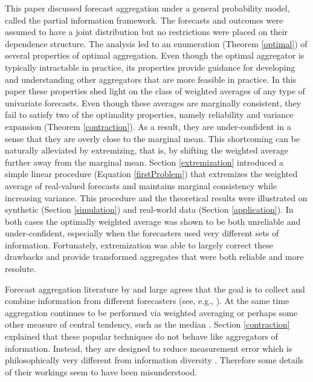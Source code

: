\documentclass[11pt]{article}
\theoremstyle{definition}
\theoremstyle{definition}
\begin{document}
This paper discussed forecast aggregation under a general probability model, called the partial information framework. The forecasts and outcomes were assumed to have a joint distribution but no restrictions were placed on their dependence structure. The analysis led to an enumeration (Theorem \ref{optimal}) of several properties of optimal aggregation. Even though the optimal aggregator is typically intractable in practice, its properties provide guidance for developing and understanding other aggregators that are more feasible in practice. In this paper these properties shed light on the class of weighted averages of any type of univariate forecasts. Even though these averages are marginally consistent, they fail to satisfy two of the optimality properties, namely reliability and variance expansion (Theorem \ref{contraction}). As a result, they are under-confident in a sense that they are overly close to the marginal mean. This shortcoming can be naturally alleviated by extremizing, that is, by shifting the weighted average further away from the marginal mean.  Section \ref{extremization} introduced a simple linear procedure (Equation \ref{firstProblem}) that extremizes the weighted average of real-valued forecasts and maintains marginal consistency while increasing variance. This procedure and the theoretical results were illustrated on synthetic (Section \ref{simulation}) and real-world data (Section \ref{application}). In both cases the optimally weighted average was shown to be both unreliable and under-confident, especially when the forecasters used very different sets of information. Fortunately, extremization was able to largely correct these drawbacks and provide transformed aggregates that were both reliable and more resolute. 


Forecast aggregation literature by and large agrees that the goal is to collect and combine  information from different forecasters (see, e.g., \citealt{forlines2012heuristics, armstrong2, dawid1995coherent}). At the same time aggregation continues to be performed via weighted averaging or perhaps some other measure of central tendency, such as the median \citep{armstrong2, levins1966strategy, lobo2010human}. Section \ref{contraction} explained that these popular techniques do not behave like aggregators of information. Instead, they are designed to reduce measurement error which is philosophically very different from information diversity \citep{satopaamodeling2}. Therefore some details of their workings seem to have been misunderstood.
\end{document}
